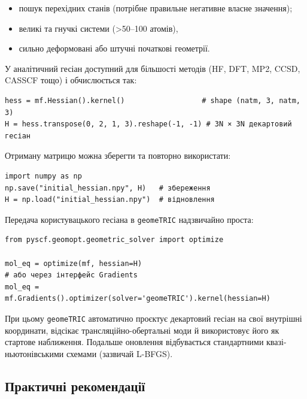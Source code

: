 \begin{itemize}
    \item пошук перехідних станів (потрібне правильне негативне власне значення);
    \item великі та гнучкі системи (>50–100 атомів),%
    \item сильно деформовані або штучні початкові геометрії.
\end{itemize}

У \PySCF{} аналітичний гесіан доступний для більшості методів (HF, DFT, MP2, CCSD, CASSCF тощо) і обчислюється так:

\begin{verbatim}
hess = mf.Hessian().kernel()                  # shape (natm, 3, natm, 3)
H = hess.transpose(0, 2, 1, 3).reshape(-1, -1) # 3N × 3N декартовий гесіан
\end{verbatim}

Отриману матрицю можна зберегти та повторно використати:

\begin{verbatim}
import numpy as np
np.save("initial_hessian.npy", H)   # збереження
H = np.load("initial_hessian.npy")  # відновлення
\end{verbatim}

Передача користувацького гесіана в \texttt{geomeTRIC} надзвичайно проста:

\begin{verbatim}
from pyscf.geomopt.geometric_solver import optimize

mol_eq = optimize(mf, hessian=H)
# або через інтерфейс Gradients
mol_eq = mf.Gradients().optimizer(solver='geomeTRIC').kernel(hessian=H)
\end{verbatim}

При цьому \texttt{geomeTRIC} автоматично проєктує декартовий гесіан на свої внутрішні координати, відсікає трансляційно-обертальні моди й використовує його як стартове наближення. Подальше оновлення відбувається стандартними квазі-ньютонівськими схемами (зазвичай L-BFGS).

\subsection{Практичні рекомендації}

